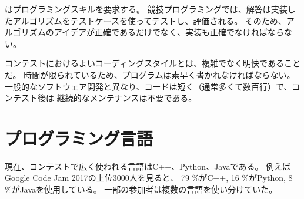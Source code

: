 はプログラミングスキルを要求する。
競技プログラミングでは、解答は実装したアルゴリズムをテストケースを使ってテストし、評価される。
そのため、アルゴリズムのアイデアが正確であるだけでなく、実装も正確でなければならない。

\begin{comment}
A good coding style in contests is
straightforward and concise.
Programs should be written quickly,
because there is not much time available.
Unlike in traditional software engineering,
the programs are short (usually at most some
hundreds of lines) and it is not needed to 
maintain them after the contest.
\end{comment}

コンテストにおけるよいコーディングスタイルとは、複雑でなく明快であることだ。
時間が限られているため、プログラムは素早く書かれなければならない。
一般的なソフトウェア開発と異なり、コードは短く（通常多くて数百行）で、コンテスト後は
継続的なメンテナンスは不要である。


\begin{comment}
\section{Programming languages}

\index{programming language}
\end{comment}

\section{プログラミング言語}


\begin{comment}
At the moment, the most popular programming
languages used in contests are C++, Python and Java.
For example, in Google Code Jam 2017,
among the best 3,000 participants,
79 \% used C++,
16 \% used Python and
8 \% used Java \cite{goo17}.
Some participants also used several languages.
\end{comment}

現在、コンテストで広く使われる言語はC++、Python、Javaである。
例えばGoogle Code Jam 2017の上位3000人を見ると、
79 \%がC++, 16 \%がPython, 8 \%がJavaを使用している。
一部の参加者は複数の言語を使い分けていた。

\begin{comment}
Many people think that C++ is the best choice
for a competitive programmer,
and C++ is nearly always available in
contest systems.
The benefits of using C++ are that
it is a very efficient language and
its standard library contains a 
large collection
of data structures and algorithms.
\end{comment}

